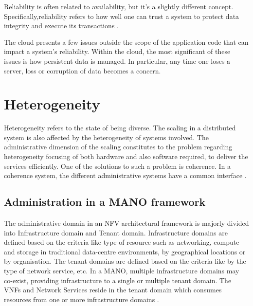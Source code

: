Reliability is often related to availability, but it’s a slightly different concept. Specifically,reliability refers to how well one can trust a system to protect data integrity and execute its transactions \cite{reese_cloud_nodate}.

The cloud presents a few issues outside the scope of the application code that can impact a system’s reliability. Within the cloud, the most significant of these issues is how persistent data is managed. In particular, any time one loses a server, loss or corruption of data becomes a concern.

\section{Heterogeneity}
\paragraph{}Heterogeneity refers to the state of being diverse. The scaling in a distributed system is also affected by the heterogeneity of systems involved. The administrative dimension of the scaling constitutes to the problem regarding heterogeneity focusing of both hardware and also software required, to deliver the services efficiently. One of the solutions to such a problem is coherence. In a coherence system, the different administrative systems have a common interface \cite{ord1994scale}.



\subsection{Administration in a MANO framework}
\paragraph{}The administrative domain in an NFV architectural framework is majorly divided into Infrastructure domain and Tenant domain. Infrastructure domains are defined based on the criteria like type of resource such as networking, compute and storage in traditional data-centre environments, by geographical locations or by organisation. The tenant domains are defined based on the criteria like by the type of network service, etc. In a MANO, multiple infrastructure domains may co-exist, providing infrastructure to a single or multiple tenant domain. The VNFs and Network Services reside in the tenant domain which consumes resources from one or more infrastructure domains \cite{peinetwork}.

